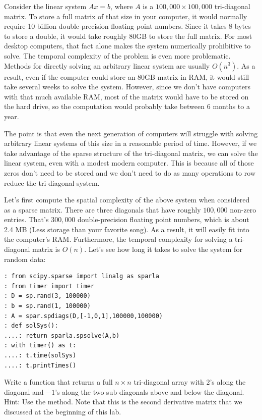 Consider the linear system $A x = b$, where $A$ is a
 $100,\!000\times 100,\!000$ tri-diagonal matrix.  To store a full
matrix of that size in your computer, it would normally require 10
billion double-precision floating-point numbers.  Since it takes 8
bytes to store a double, it would take roughly 80GB to store the
full matrix.  For most desktop computers, that fact alone makes the
system numerically prohibitive to solve. The temporal complexity of the problem is even more problematic. Methods for directly solving an arbitrary linear system are usually $O(n^3)$.  As
a result, even if the computer could store an 80GB matrix in RAM, it
would still take several weeks to solve the system.  However, since
we don't have computers with that much available RAM, most of the
matrix would have to be stored on the hard drive, so the computation
would probably take between $6$ months to a year.

The point is that even the next generation of computers will
struggle with solving arbitrary linear systems of this size in a
reasonable period of time.  However, if we take advantage of the
sparse structure of the tri-diagonal matrix, we can solve the linear
system, even with a modest modern computer.  This is because all of
those zeros don't need to be stored and we don't need to do as many
operations to row reduce the tri-diagonal system.

Let's first compute the spatial complexity of the above system when
considered as a sparse matrix.  There are three diagonals that have
roughly $100,\!000$ non-zero entries.  That's $300,\!000$
double-precision floating point numbers, which is about 2.4 MB (Less
storage than your favorite song).  As a result, it will easily
fit into the computer's RAM.  Furthermore, the temporal complexity for solving
a tri-diagonal matrix is $O(n)$. Let's see how long it takes to
solve the system for random data:

\begin{lstlisting}
: from scipy.sparse import linalg as sparla
: from timer import timer
: D = sp.rand(3, 100000)
: b = sp.rand(1, 100000)
: A = spar.spdiags(D,[-1,0,1],100000,100000)
: def solSys():
....: return sparla.spsolve(A,b)
: with timer() as t:
....: t.time(solSys)
....: t.printTimes()
\end{lstlisting}

\begin{problem}
Write a function that returns a full $n\times n$
tri-diagonal array with $2$'s along the diagonal and $-1$'s along
the two sub-diagonals above and below the diagonal. Hint: Use the  method. Note that this is the second derivative matrix that we discussed at the beginning of this lab.
\end{problem}

